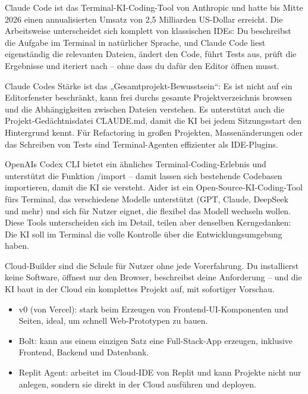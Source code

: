 
Claude Code ist das Terminal-KI-Coding-Tool von Anthropic und hatte bis Mitte 2026 einen annualisierten Umsatz von 2,5 Milliarden US-Dollar erreicht. Die Arbeitsweise unterscheidet sich komplett von klassischen IDEs: Du beschreibst die Aufgabe im Terminal in natürlicher Sprache, und Claude Code liest eigenständig die relevanten Dateien, ändert den Code, führt Tests aus, prüft die Ergebnisse und iteriert nach – ohne dass du dafür den Editor öffnen musst.

Claude Codes Stärke ist das „Gesamtprojekt-Bewusstsein“: Es ist nicht auf ein Editorfenster beschränkt, kann frei durchs gesamte Projektverzeichnis browsen und die Abhängigkeiten zwischen Dateien verstehen. Es unterstützt auch die Projekt-Gedächtnisdatei CLAUDE.md, damit die KI bei jedem Sitzungsstart den Hintergrund kennt. Für Refactoring in großen Projekten, Massenänderungen oder das Schreiben von Tests sind Terminal-Agenten effizienter als IDE-Plugins.


OpenAIs Codex CLI bietet ein ähnliches Terminal-Coding-Erlebnis und unterstützt die Funktion /import – damit lassen sich bestehende Codebasen importieren, damit die KI sie versteht. Aider ist ein Open-Source-KI-Coding-Tool fürs Terminal, das verschiedene Modelle unterstützt (GPT, Claude, DeepSeek und mehr) und sich für Nutzer eignet, die flexibel das Modell wechseln wollen. Diese Tools unterscheiden sich im Detail, teilen aber denselben Kerngedanken: Die KI soll im Terminal die volle Kontrolle über die Entwicklungsumgebung haben.


Cloud-Builder sind die Schule für Nutzer ohne jede Vorerfahrung. Du installierst keine Software, öffnest nur den Browser, beschreibst deine Anforderung – und die KI baut in der Cloud ein komplettes Projekt auf, mit sofortiger Vorschau.

\begin{itemize}
  \item v0 (von Vercel): stark beim Erzeugen von Frontend-UI-Komponenten und Seiten, ideal, um schnell Web-Prototypen zu bauen.
  \item Bolt: kann aus einem einzigen Satz eine Full-Stack-App erzeugen, inklusive Frontend, Backend und Datenbank.
  \item Replit Agent: arbeitet im Cloud-IDE von Replit und kann Projekte nicht nur anlegen, sondern sie direkt in der Cloud ausführen und deployen.
\end{itemize}

